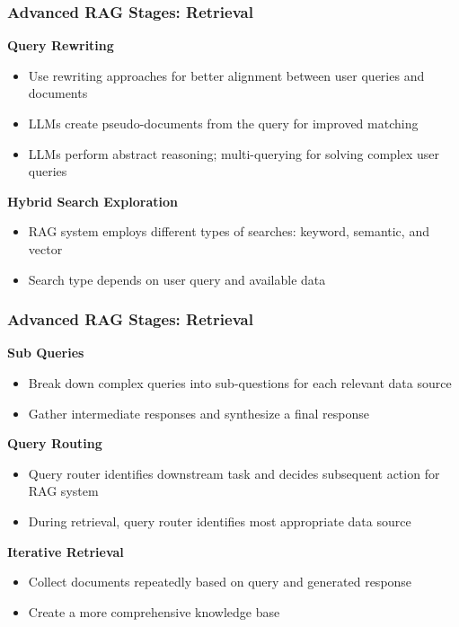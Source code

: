 \begin{frame}[fragile]\frametitle{Advanced RAG Stages: Retrieval}
\textbf{Query Rewriting}
  \begin{itemize}
    \item Use rewriting approaches for better alignment between user queries and documents
    \item LLMs create pseudo-documents from the query for improved matching
    \item LLMs perform abstract reasoning; multi-querying for solving complex user queries
  \end{itemize}
\textbf{Hybrid Search Exploration}
  \begin{itemize}
    \item RAG system employs different types of searches: keyword, semantic, and vector
    \item Search type depends on user query and available data
  \end{itemize}
\end{frame}

\begin{frame}[fragile]\frametitle{Advanced RAG Stages: Retrieval}
\textbf{Sub Queries}
  \begin{itemize}
    \item Break down complex queries into sub-questions for each relevant data source
    \item Gather intermediate responses and synthesize a final response
  \end{itemize}
\textbf{Query Routing}
  \begin{itemize}
    \item Query router identifies downstream task and decides subsequent action for RAG system
    \item During retrieval, query router identifies most appropriate data source
  \end{itemize}
\textbf{Iterative Retrieval}
  \begin{itemize}
    \item Collect documents repeatedly based on query and generated response
    \item Create a more comprehensive knowledge base
  \end{itemize}
\end{frame}

